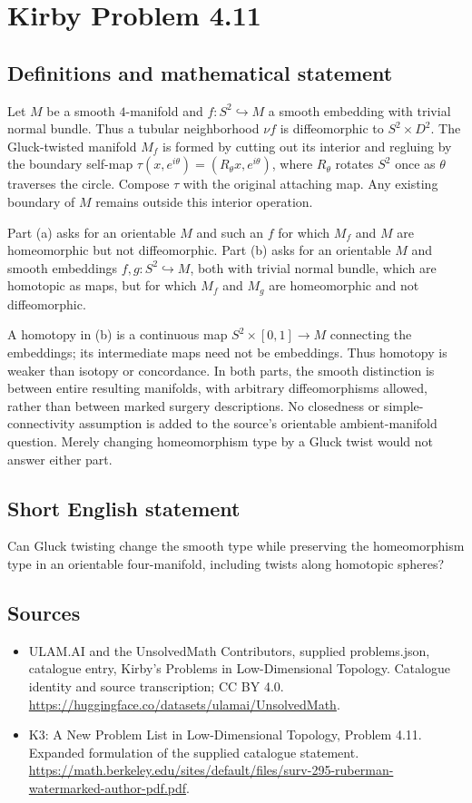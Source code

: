 \documentclass[11pt,a4paper]{article}
\begin{document}
\section*{Kirby Problem 4.11}\label{statement}

\subsection{Definitions and mathematical statement}
Let $M$ be a smooth $4$-manifold and $f:S^2\hookrightarrow M$ a
smooth embedding with trivial normal bundle. Thus a tubular neighborhood
$\nu f$ is diffeomorphic to $S^2\times D^2$.
The Gluck-twisted manifold $M_f$ is formed by cutting out its interior
and regluing by the boundary self-map
$\tau(x,e^{i\theta})=(R_\theta x,e^{i\theta})$, where $R_\theta$
rotates $S^2$ once as $\theta$ traverses the circle. Compose $\tau$
with the original attaching map. Any existing boundary of $M$ remains
outside this interior operation.

Part (a) asks for an orientable $M$ and such an $f$ for which $M_f$
and $M$ are homeomorphic but not diffeomorphic.
Part (b) asks for an orientable $M$ and smooth embeddings
$f,g:S^2\hookrightarrow M$, both with trivial normal bundle, which
are homotopic as maps, but for which $M_f$ and $M_g$ are homeomorphic
and not diffeomorphic.

A homotopy in (b) is a continuous map $S^2\times[0,1]\to M$ connecting
the embeddings; its intermediate maps need not be embeddings. Thus
homotopy is weaker than isotopy or concordance. In both parts, the
smooth distinction is between entire resulting manifolds, with arbitrary
diffeomorphisms allowed, rather than between marked surgery descriptions.
No closedness or simple-connectivity assumption is added to the source's
orientable ambient-manifold question. Merely changing homeomorphism type
by a Gluck twist would not answer either part.
\subsection{Short English statement}
Can Gluck twisting change the smooth type while preserving the homeomorphism type in an orientable four-manifold, including twists along homotopic spheres?
\subsection{Sources}
\begin{itemize}
\item[S1] ULAM.AI and the UnsolvedMath Contributors, supplied problems.json, catalogue entry, Kirby's Problems in Low-Dimensional Topology. Catalogue identity and source transcription; CC BY 4.0.
\url{https://huggingface.co/datasets/ulamai/UnsolvedMath}.
\item[S2] K3: A New Problem List in Low-Dimensional Topology, Problem 4.11. Expanded formulation of the supplied catalogue statement.
\url{https://math.berkeley.edu/sites/default/files/surv-295-ruberman-watermarked-author-pdf.pdf}.
\end{itemize}
\end{document}
